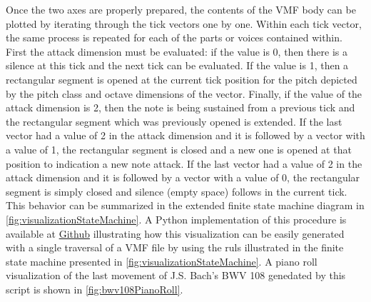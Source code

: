 Once the two axes are properly prepared, the contents of the VMF body can be plotted by iterating through the tick vectors one by one. Within each tick vector, the same process is repeated for each of the parts or voices contained within. First the attack dimension must be evaluated: if the value is 0, then there is a silence at this tick and the next tick can be evaluated. If the value is 1, then a rectangular segment is opened at the current tick position for the pitch depicted by the pitch class and octave dimensions of the vector. Finally, if the value of the attack dimension is 2, then the note is being sustained from a previous tick and the rectangular segment which was previously opened is extended. If the last vector had a value of 2 in the attack dimension and it is followed by a vector with a value of 1, the rectangular segment is closed and a new one is opened at that position to indication a new note attack. If the last vector had a value of 2 in the attack dimension and it is followed by a vector with a value of 0, the rectangular segment is simply closed and silence (empty space) follows in the current tick. This behavior can be summarized in the extended finite state machine diagram in \ref{fig:visualizationStateMachine}. A Python implementation of this procedure is available at \href{https://github.com/project-schumann/vmf-visualization}{Github} illustrating how this visualization can be easily generated with a single traversal of a VMF file by using the ruls illustrated in the finite state machine presented in \ref{fig:visualizationStateMachine}. A piano roll visualization of the last movement of J.S. Bach's BWV 108 genedated by this script is shown in \ref{fig:bwv108PianoRoll}.


